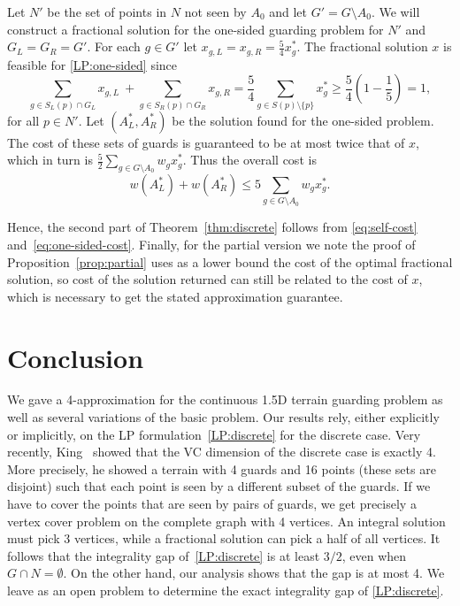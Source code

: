 \documentclass[11pt]{article}
\begin{document}
Let $N'$ be the set of points in $N$ not seen by $A_0$ and let $G' = G
\setminus A_0$. We will construct a fractional solution for the one-sided
guarding problem for $N'$ and $G_L=G_R=G'$. For each $g \in G'$
let $x_{g,L} = x_{g,R} = \frac{5}{4} x^*_g$. The fractional solution $x$ is
feasible for \eqref{LP:one-sided} since
\begin{equation*}
  \sum_{g\in S_L(p)\cap G_L} x_{g,L}\ + \sum_{g \in S_R(p)\cap G_R} x_{g,R} = \frac{5}{4} \sum_{g \in S(p)
  \setminus \{ p \}} x^*_g \geq  \frac54 \left(1 - \frac15\right) = 1,
\end{equation*}
for all $p\in N'$.
Let $(A^*_L,A^*_R)$ be the solution found for the one-sided problem. The
cost of these sets of guards is guaranteed to be at most twice that of $x$,
which in turn is $\frac52 \sum_{g \in G \setminus
  A_0} w_g x_g^*$. Thus the overall cost is
\begin{equation}
   \label{eq:one-sided-cost}
   w(A^*_L) + w(A^*_R) \leq 5 \sum_{g \in G \setminus A_0} w_g x^*_g.
\end{equation}

Hence, the second part of Theorem~\ref{thm:discrete} follows from
\eqref{eq:self-cost} and~\eqref{eq:one-sided-cost}. Finally, for the partial
version we note the proof of Proposition~\ref{prop:partial} uses as a lower
bound the cost of the optimal fractional solution, so cost of the solution
returned can still be related to the cost of $x$, which is necessary to get
the stated approximation guarantee.

\section{Conclusion}

We gave a 4-approximation for the continuous 1.5D terrain guarding problem as
well as several variations of the basic problem. Our results rely, either
explicitly or implicitly, on the LP formulation~\eqref{LP:discrete} for the
discrete case. Very recently, King~\cite{conf/cccg/King08} showed that the VC
dimension of the discrete case is exactly 4. More precisely, he showed a
terrain with 4 guards and 16 points (these sets are disjoint) such that each
point is seen by a different subset of the guards. If we have to cover the
points that are seen by pairs of guards, we get precisely a vertex cover
problem on the complete graph with 4 vertices. An integral solution must pick
3 vertices, while a fractional solution can pick a half of all vertices. It
follows that
the integrality gap of~\eqref{LP:discrete} is at least $3/2$, even when $G
\cap N =
\emptyset$. On the other hand, our analysis shows that the gap is at most 4. We leave as an open problem to determine the exact integrality gap of \eqref{LP:discrete}.





\end{document}
